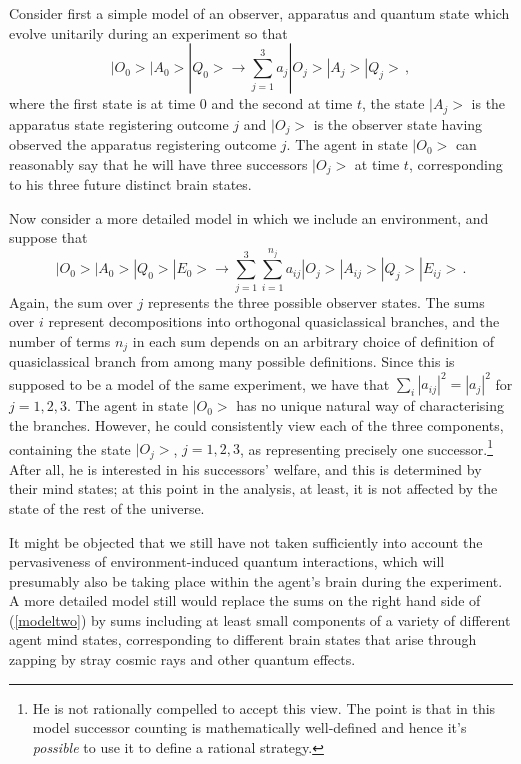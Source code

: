 \documentclass[aps,
pra,epsfig,12pt]{revtex4}
\begin{document}
Consider first a simple model of 
an observer, apparatus and quantum state which evolve
unitarily during an experiment so that \begin{equation} | O_0 > | A_0
> | Q_0 > \rightarrow \sum_{j=1}^3 a_j | O_j > | A_j > | Q_j > \, ,
\end{equation} where the first state is at time $0$ and the second at
time $t$, the state $ | A_j > $ is the apparatus state registering
outcome $j$ and $ | O_j > $ is the observer state having observed the
apparatus registering outcome $j$.  The agent in state $ | O_0 >$ can
reasonably say that he will have three successors $ | O_j >$ at time
$t$, corresponding to his three future distinct brain states.

Now consider a more detailed model in which we include an environment,
and suppose that 
\begin{equation}\label{modeltwo} | O_0 > | A_0 > |
Q_0 > | E_0 > \rightarrow \sum_{j=1}^3 \sum_{i=1}^{n_j} 
a_{ij} | O_j > | A_{ij} > | Q_{j}> | E_{ij} >  \, .
\end{equation} 
Again, the sum over $j$ represents the three possible
observer states.  The sums over $i$ represent
decompositions into orthogonal quasiclassical branches, and the number
of terms $n_j$ in each sum depends on an arbitrary choice 
of definition of quasiclassical branch from among many possible 
definitions.  Since this is supposed to be a model of
the same experiment, we have that $ \sum_i | a_{ij} |^2 = | a_j |^2 $
for $j = 1,2,3$.  The agent in state $| O_0 >$ has no unique natural
way of characterising the branches.  However, he could consistently view
each of the three components, containing the state $| O_j >$, $j=1,2,3$,
as representing precisely one successor.\footnote{
He is not rationally compelled to accept this view. 
The point is that in this model successor counting is mathematically 
well-defined and hence it's {\it possible} to use it to define
a rational strategy.}  
After all, he is interested in his successors' welfare, and this is
determined by their mind states; at this point in
the analysis, at least, it is not affected by the state of the rest of the
universe.  

It might be objected that we still have not taken sufficiently into
account the pervasiveness of environment-induced quantum interactions,
which will presumably also be taking place within the agent's brain during the
experiment.  A more detailed model still would replace the sums on the
right hand side of (\ref{modeltwo}) by sums including at least small
components of a variety of different agent mind states, corresponding
to different brain states that arise through zapping by stray cosmic
rays and other quantum effects.
\end{document}
